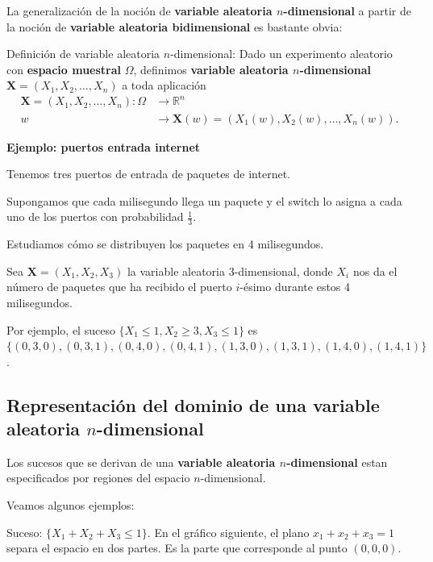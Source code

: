 \documentclass[
  letterpaper,
  DIV=11,
  numbers=noendperiod]{scrreprt}
\begin{document}
La generalización de la noción de \textbf{variable aleatoria
\(n\)-dimensional} a partir de la noción de \textbf{variable aleatoria
bidimensional} es bastante obvia:

Definición de variable aleatoria \(n\)-dimensional: Dado un experimento
aleatorio con \textbf{espacio muestral} \(\Omega\), definimos
\textbf{variable aleatoria \(n\)-dimensional}
\(\mathbf{X}=(X_1,X_2,\ldots,X_n)\) a toda aplicación \[
\begin{array}{rl}
\mathbf{X}=(X_1,X_2,\ldots,X_n): \Omega & \longrightarrow \mathbb{R}^n\\
w & \longrightarrow \mathbf{X}(w)=(X_1(w),X_2(w),\ldots,X_n(w)).
\end{array}
\]

\textbf{Ejemplo: puertos entrada internet}

Tenemos tres puertos de entrada de paquetes de internet.

Supongamos que cada milisegundo llega un paquete y el switch lo asigna a
cada uno de los puertos con probabilidad \(\frac{1}{3}\).

Estudiamos cómo se distribuyen los paquetes en 4 milisegundos.

Sea \(\mathbf{X}=(X_1,X_2,X_3)\) la variable aleatoria 3-dimensional,
donde \(X_i\) nos da el número de paquetes que ha recibido el puerto
\(i\)-ésimo durante estos 4 milisegundos.

Por ejemplo, el suceso \(\{X_1\leq 1, X_2\geq 3, X_3\leq 1\}\) es
\(\{(0,3,0),(0,3,1),(0,4,0),(0,4,1),(1,3,0),(1,3,1),(1,4,0),(1,4,1)\}\).

\hypertarget{representaciuxf3n-del-dominio-de-una-variable-aleatoria-n-dimensional}{%
\subsection{\texorpdfstring{Representación del dominio de una variable
aleatoria
\(n\)-dimensional}{Representación del dominio de una variable aleatoria n-dimensional}}\label{representaciuxf3n-del-dominio-de-una-variable-aleatoria-n-dimensional}}

Los sucesos que se derivan de una \textbf{variable aleatoria
\(n\)-dimensional} estan especificados por regiones del espacio
\(n\)-dimensional.

Veamos algunos ejemplos:

Suceso: \(\{X_1+X_2+X_3\leq 1\}\). En el gráfico siguiente, el plano
\(x_1+x_2+x_3=1\) separa el espacio en dos partes. Es la parte que
corresponde al punto \((0,0,0)\).
\end{document}
